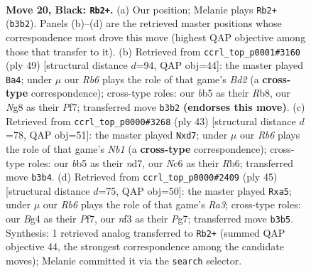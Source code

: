 \documentclass[11pt]{article}
\begin{document}
\clearpage

\begin{figure}[p]\centering
\begin{subfigure}{0.46\textwidth}\centering
\resizebox{\linewidth}{!}{%
\newchessgame
\chessboard[
  setfen={4k1nr/5ppp/2n5/1B2P2P/P5b1/1r3N2/5KP1/RN5R b k - 1 20},
  showmover=false,
  pgfstyle=straightmove, color=movearrow, markmove={b3-b2}
]}
\caption{}
\end{subfigure}\hfill
\begin{subfigure}{0.46\textwidth}\centering
\resizebox{\linewidth}{!}{%
\newchessgame
\chessboard[
  setfen={1r4k1/3b1pp1/3p3p/p7/1P1Nr3/P5P1/5P1P/1R1R2K1 b - - 0 25},
  showmover=false,
  pgfstyle=straightmove, color=movearrow, markmove={d7-a4}
]}
\caption{}
\end{subfigure}
\\[4pt]
\begin{subfigure}{0.46\textwidth}\centering
\resizebox{\linewidth}{!}{%
\newchessgame
\chessboard[
  setfen={1nk5/2pN2rN/1r6/pp3p2/2p2P2/P7/1P2R1PP/3R2K1 b - - 0 22},
  showmover=false,
  pgfstyle=straightmove, color=movearrow, markmove={b8-d7}
]}
\caption{}
\end{subfigure}\hfill
\begin{subfigure}{0.46\textwidth}\centering
\resizebox{\linewidth}{!}{%
\newchessgame
\chessboard[
  setfen={1r4k1/5ppp/rn6/P2PpP2/1b4P1/8/1P1N3P/R1B2R1K b - - 0 23},
  showmover=false,
  pgfstyle=straightmove, color=movearrow, markmove={a6-a5}
]}
\caption{}
\end{subfigure}
\caption{\textbf{Move 20, Black: \texttt{Rb2+}.} (a) Our position; Melanie plays \texttt{Rb2+} (\texttt{b3b2}). Panels (b)--(d) are the retrieved master positions whose correspondence most drove this move (highest QAP objective among those that transfer to it). (b) Retrieved from \texttt{ccrl\_top\_p0001\#3160} (ply 49) [structural distance $d$=94, QAP obj=44]: the master played \texttt{Ba4}; under $\mu$ our \emph{Rb6} plays the role of that game's \emph{Bd2} (a \textbf{cross-type} correspondence); cross-type roles: our \emph{b}b5 as their \emph{R}b8, our \emph{N}g8 as their \emph{P}f7; transferred move \texttt{b3b2} \textbf{(endorses this move)}. (c) Retrieved from \texttt{ccrl\_top\_p0000\#3268} (ply 43) [structural distance $d$=78, QAP obj=51]: the master played \texttt{Nxd7}; under $\mu$ our \emph{Rb6} plays the role of that game's \emph{Nb1} (a \textbf{cross-type} correspondence); cross-type roles: our \emph{b}b5 as their \emph{n}d7, our \emph{N}c6 as their \emph{R}b6; transferred move \texttt{b3b4}. (d) Retrieved from \texttt{ccrl\_top\_p0000\#2409} (ply 45) [structural distance $d$=75, QAP obj=50]: the master played \texttt{Rxa5}; under $\mu$ our \emph{Rb6} plays the role of that game's \emph{Ra3}; cross-type roles: our \emph{B}g4 as their \emph{P}f7, our \emph{n}f3 as their \emph{P}g7; transferred move \texttt{b3b5}. Synthesis: 1 retrieved analog transferred to \texttt{Rb2+} (summed QAP objective 44, the strongest correspondence among the candidate moves); Melanie committed it via the \texttt{search} selector.}
\label{fig:thought-m39}
\end{figure}
\end{document}
